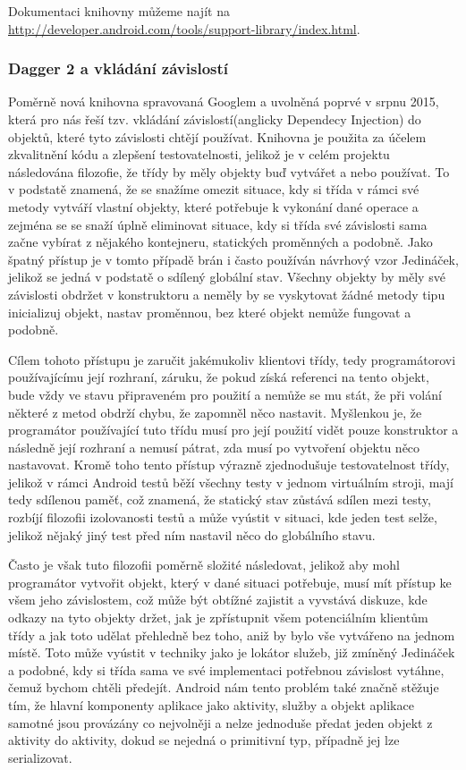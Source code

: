 \documentclass[czech,master,public,dept460,male,java,cpdeclaration]{diploma}
\begin{document}
Dokumentaci knihovny můžeme najít na \url{http://developer.android.com/tools/support-library/index.html}.

\subsubsection{Dagger 2 a vkládání závislostí}\label{dagger2}
Poměrně nová knihovna spravovaná Googlem a uvolněná poprvé v srpnu 2015, která pro nás řeší tzv. vkládání
závislostí(anglicky Dependecy Injection) do objektů,
které tyto závislosti chtějí používat. Knihovna je použita za účelem zkvalitnění kódu a zlepšení testovatelnosti, jelikož
je v celém projektu následována filozofie, že třídy by měly objekty buď vytvářet a nebo používat. To v podstatě znamená,
že se snažíme omezit situace, kdy si třída v rámci své metody vytváří vlastní objekty, které potřebuje k vykonání
dané operace a zejména se se snaží úplně eliminovat situace, kdy si třída své závislosti sama začne vybírat z nějakého
kontejneru, statických proměnných a podobně. Jako špatný přístup je v tomto případě brán i často používán návrhový vzor
Jedináček, jelikož se jedná v podstatě o sdílený globální stav. Všechny objekty by měly své závislosti obdržet v konstruktoru
a neměly by se vyskytovat žádné metody tipu inicializuj objekt, nastav proměnnou, bez které objekt nemůže fungovat a podobně.

Cílem tohoto přístupu je zaručit jakémukoliv klientovi třídy, tedy programátorovi používajícímu její rozhraní,
záruku, že pokud získá referenci na tento objekt, bude vždy ve stavu připraveném pro použití a nemůže se mu stát,
že při volání některé z metod obdrží chybu, že zapomněl něco nastavit. Myšlenkou je, že programátor používající
tuto třídu musí pro její použití vidět pouze konstruktor a následně její rozhraní a nemusí pátrat, zda musí po
vytvoření objektu něco nastavovat. Kromě toho tento přístup výrazně zjednodušuje testovatelnost třídy, jelikož v rámci
Android testů běží všechny testy v jednom virtuálním stroji, mají tedy sdílenou paměť, což znamená, že statický
stav zůstává sdílen mezi testy, rozbíjí filozofii izolovanosti testů a může vyústit v situaci, kde jeden test selže,
jelikož nějaký jiný test před ním nastavil něco do globálního stavu.

Často je však tuto filozofii poměrně složité následovat, jelikož aby mohl programátor vytvořit objekt, který
v dané situaci potřebuje, musí mít přístup ke všem jeho závislostem, což může být obtížné zajistit
a vyvstává diskuze, kde odkazy na tyto objekty držet, jak je zpřístupnit všem potenciálním klientům třídy
a jak toto udělat přehledně bez toho, aniž by bylo vše vytvářeno na jednom místě. Toto může vyústit v techniky
jako je lokátor služeb, již zmíněný Jedináček a podobné, kdy si třída sama ve své implementaci potřebnou
závislost vytáhne, čemuž bychom chtěli předejít.
Android nám tento problém také značně stěžuje tím, že hlavní komponenty aplikace jako aktivity, služby a objekt
aplikace samotné jsou provázány co nejvolněji a nelze jednoduše předat jeden objekt z aktivity do aktivity,
dokud se nejedná o primitivní typ, případně jej lze serializovat.
\end{document}
